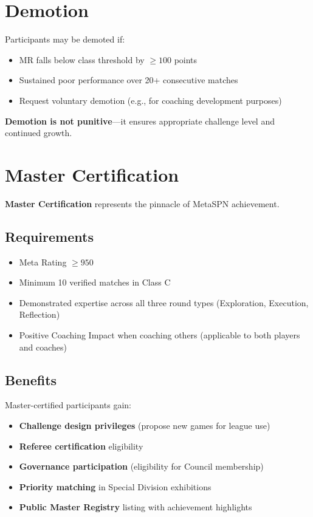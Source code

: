 \section{Demotion}

Participants may be demoted if:
\begin{itemize}[leftmargin=*]
  \item MR falls below class threshold by $\geq 100$ points
  \item Sustained poor performance over 20+ consecutive matches
  \item Request voluntary demotion (e.g., for coaching development purposes)
\end{itemize}

\textbf{Demotion is not punitive}—it ensures appropriate challenge level and continued growth.

\section{Master Certification}

\textbf{Master Certification} represents the pinnacle of MetaSPN achievement.

\subsection{Requirements}

\begin{itemize}[leftmargin=*]
  \item Meta Rating $\geq 950$
  \item Minimum 10 verified matches in Class C
  \item Demonstrated expertise across all three round types (Exploration, Execution, Reflection)
  \item Positive Coaching Impact when coaching others (applicable to both players and coaches)
\end{itemize}

\subsection{Benefits}

Master-certified participants gain:
\begin{itemize}[leftmargin=*]
  \item \textbf{Challenge design privileges} (propose new games for league use)
  \item \textbf{Referee certification} eligibility
  \item \textbf{Governance participation} (eligibility for Council membership)
  \item \textbf{Priority matching} in Special Division exhibitions
  \item \textbf{Public Master Registry} listing with achievement highlights
\end{itemize}

